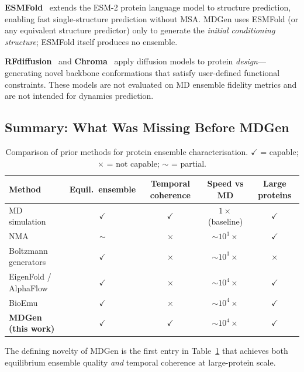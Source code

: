 \documentclass[11pt,a4paper]{article}
\begin{document}
\textbf{ESMFold}~\cite{lin2023} extends the ESM-2 protein language model to structure prediction,
enabling fast single-structure prediction without MSA.  MDGen uses ESMFold (or any equivalent
structure predictor) only to generate the \emph{initial conditioning structure}; ESMFold itself
produces no ensemble.

\textbf{RFdiffusion}~\cite{watson2023} and \textbf{Chroma}~\cite{ingraham2023} apply diffusion
models to protein \emph{design}---generating novel backbone conformations that satisfy user-defined
functional constraints.  These models are not evaluated on MD ensemble fidelity metrics and are not
intended for dynamics prediction.

\subsection{Summary: What Was Missing Before MDGen}

\begin{table}[H]
  \centering
  \caption{Comparison of prior methods for protein ensemble characterisation.
           $\checkmark$ = capable; $\times$ = not capable; $\sim$ = partial.}
  \label{tab:prior_comparison}
  \renewcommand{\arraystretch}{1.3}
  \begin{tabularx}{\textwidth}{Xcccc}
    \toprule
    \textbf{Method} & \textbf{Equil.\ ensemble} & \textbf{Temporal coherence} & \textbf{Speed vs MD} & \textbf{Large proteins} \\
    \midrule
    MD simulation       & $\checkmark$ & $\checkmark$ & $1\times$ (baseline) & $\checkmark$ \\
    NMA                 & $\sim$       & $\times$     & $\sim 10^3\times$    & $\checkmark$ \\
    Boltzmann generators & $\checkmark$ & $\times$    & $\sim 10^3\times$    & $\times$ \\
    EigenFold / AlphaFlow & $\checkmark$ & $\times$  & $\sim 10^4\times$    & $\checkmark$ \\
    BioEmu              & $\checkmark$ & $\times$     & $\sim 10^4\times$    & $\checkmark$ \\
    \textbf{MDGen (this work)} & $\checkmark$ & $\checkmark$ & $\sim 10^4\times$ & $\checkmark$ \\
    \bottomrule
  \end{tabularx}
\end{table}

The defining novelty of MDGen is the first entry in Table~\ref{tab:prior_comparison} that achieves
both equilibrium ensemble quality \emph{and} temporal coherence at large-protein scale.
\end{document}
